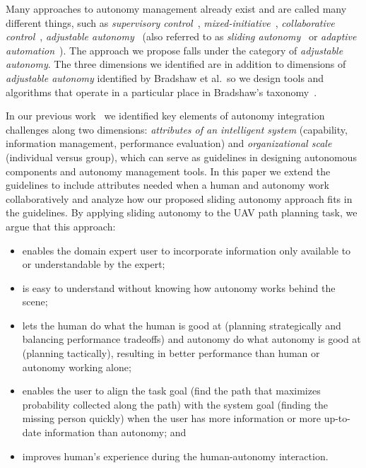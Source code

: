 \documentclass[lettersize, apacite, twoside, HRI]{apa_HRI}
\begin{document}
Many approaches to autonomy management already exist and are called many different things, such as \textit{supervisory control}~\cite{Sheridan1992Telerobotics}, \textit{mixed-initiative}~\cite{Hearst1999Mixed}, \textit{collaborative control}~\cite{Fong1999Collaborative}, \textit{adjustable autonomy}~\cite{Dorais1998AdjustableAutonomy,Dorais2001Designing} (also referred to as \textit{sliding autonomy}~\cite{Dias2008SlidingAutonomy} or \textit{adaptive automation}~\cite{Rouse1988Adaptive,Kaber2001Design}). The approach we propose falls under the category of \textit{adjustable autonomy}. The three dimensions we identified are in addition to dimensions of \textit{adjustable autonomy} identified by Bradshaw et al.\, so we design tools and algorithms that operate in a particular place in Bradshaw's taxonomy~\cite{Bradshaw2004Dimensions}.

In our previous work~\cite{Lin2010Supporting} we identified key elements of autonomy integration challenges along two dimensions: \textit{attributes of an intelligent system} (capability, information management, performance evaluation) and \textit{organizational scale} (individual versus group), which can serve as guidelines in designing autonomous components and autonomy management tools. In this paper we extend the guidelines to include attributes needed when a human and autonomy work collaboratively and analyze how our proposed sliding autonomy approach fits in the guidelines. By applying sliding autonomy to the UAV path planning task, we argue that this approach:
\begin{itemize}
\item enables the domain expert user to incorporate information only available to or understandable by the expert;
\item is easy to understand without knowing how autonomy works behind the scene;
\item lets the human do what the human is good at (planning strategically and balancing performance tradeoffs) and autonomy do what autonomy is good at (planning tactically), resulting in better performance than human or autonomy working alone;
\item enables the user to align the task goal (find the path that maximizes probability collected along the path) with the system goal (finding the missing person quickly) when the user has more information or more up-to-date information than autonomy; and
\item improves human's experience during the human-autonomy interaction.
\end{itemize}
\end{document}
